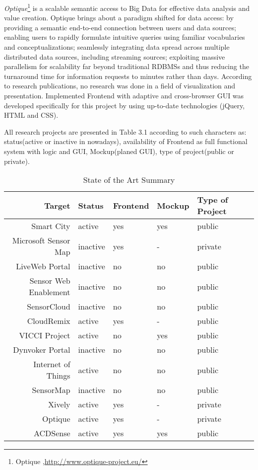     \emph{Optique}\footnote{Optique ,\url{http://www.optique-project.eu/}} is a scalable semantic access to Big Data for effective data analysis and value creation. Optique brings about a paradigm shifted for data access: by providing a semantic end-to-end connection between users and data sources; enabling users to rapidly formulate intuitive queries using familiar vocabularies and conceptualizations; seamlessly integrating data spread across multiple distributed data sources, including streaming sources; exploiting massive parallelism for scalability far beyond traditional RDBMSs and thus reducing the turnaround time for information requests to minutes rather than days\cite{calvanese-etal-JAIR-2013-explanation,ernestojimenezruizbernardocuencagrau2013ontology,DBLP:conf/dlog/MollerNOW13ohneCross}. According to research publications, no research was done in a field of visualization and presentation. Implemented Frontend with adaptive and cross-browser GUI was developed specifically for this project by using up-to-date technologies (jQuery, HTML and CSS).

    All research projects are presented in Table 3.1 according to such characters as: status(active or inactive in nowadays), availability of Frontend as full functional system with logic and GUI, Mockup(planed GUI), type of project(public or private).

    \begin{table}[H]
	\centering
	\begin{tabular}{|r|l|l|l|l|l|}
	\hline
	Target 			       & Status & Frontend & Mockup & Type of Project \\
	\hline 
	\hline
	Smart City		       & active & yes & yes & public \\
	\hline
	Microsoft Sensor Map   & inactive & yes & - & private \\
	\hline
	LiveWeb Portal	       & inactive & no & no & public \\
	\hline
	Sensor Web Enablement  & inactive & no & no & public \\
	\hline
	SensorCloud		       & inactive & no & no & public \\
	\hline
	CloudRemix		       & active & yes & - & public \\
	\hline
	VICCI Project		   & active & no & yes & public \\
	\hline
	Dynvoker Portal		   & inactive & no & no & public \\
	\hline
	Internet of Things	   & active & no & no & public \\
	\hline
	SensorMap              & inactive & no & no & public \\
	\hline
	Xively                 & active & yes & - & private \\
	\hline
	Optique                & active & yes & - & private \\
	\hline
	ACDSense               & active & yes & yes & public \\
	\hline
	\end{tabular}
	\caption[State of the Art]{State of the Art Summary}
	\label{tab:state_of_the_art}
	\end{table}

